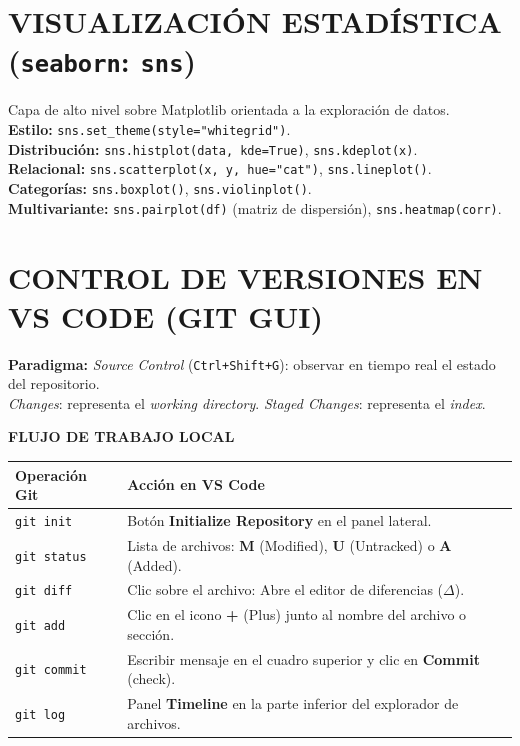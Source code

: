 \section{VISUALIZACIÓN ESTADÍSTICA (\texttt{seaborn}: \texttt{sns})} Capa de alto nivel sobre Matplotlib orientada a la exploración de datos. \\\textbf{Estilo:} \texttt{sns.set\_theme(style="whitegrid")}. \\ \textbf{Distribución:} \texttt{sns.histplot(data, kde=True)}, \texttt{sns.kdeplot(x)}. \\ \textbf{Relacional:} \texttt{sns.scatterplot(x, y, hue="cat")}, \texttt{sns.lineplot()}. \\ \textbf{Categorías:} \texttt{sns.boxplot()}, \texttt{sns.violinplot()}. \\ \textbf{Multivariante:} \texttt{sns.pairplot(df)} (matriz de dispersión), \texttt{sns.heatmap(corr)}.





\section*{CONTROL DE VERSIONES EN VS CODE (GIT GUI)}

\textbf{Paradigma:} \textit{Source Control} (\texttt{Ctrl+Shift+G}): observar en tiempo real el estado del repositorio.\\\textit{Changes}: representa el \textit{working directory}. \textit{Staged Changes}: representa el \textit{index}.

\textbf{FLUJO DE TRABAJO LOCAL}
\begin{tabular}{lp{10cm}}
    \toprule
    \textbf{Operación Git} & \textbf{Acción en VS Code} \\
    \midrule
    \texttt{git init} & Botón \textbf{Initialize Repository} en el panel lateral. \\
    \texttt{git status} & Lista de archivos: \textbf{M} (Modified), \textbf{U} (Untracked) o \textbf{A} (Added). \\
    \texttt{git diff} & Clic sobre el archivo: Abre el editor de diferencias ($\Delta$). \\
    \texttt{git add} & Clic en el icono \textbf{+} (Plus) junto al nombre del archivo o sección. \\
    \texttt{git commit} & Escribir mensaje en el cuadro superior y clic en \textbf{Commit} (check). \\
    \texttt{git log} & Panel \textbf{Timeline} en la parte inferior del explorador de archivos. \\
    \bottomrule
\end{tabular}

